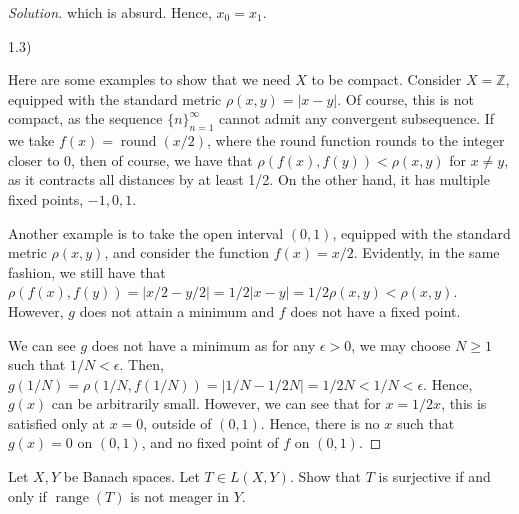\documentclass[10pt]{article}
\newenvironment{problem}[2][]{\begin{trivlist}
\item[\hskip \labelsep {\bfseries #1}\hskip \labelsep {\bfseries #2.}]}{\end{trivlist}}
\begin{document}
\begin{proof}[Solution]
which is absurd. Hence, $x_0 = x_1$. 

1.3)

Here are some examples to show that we need $X$ to be compact. Consider $X = \mathbb{Z}$, equipped with the standard metric $\rho(x,y) = | x - y | $. Of course, this is not compact, as the sequence $\{ n \}_{n=1}^\infty$ cannot admit any convergent subsequence. If we take $f(x) = \operatorname{round}(x/2)$, where the round function rounds to the integer closer to $0$, then of course, we have that $\rho(f(x), f(y)) < \rho(x,y)$ for $x \not = y$, as it contracts all distances by at least 1/2. On the other hand, it has multiple fixed points, $-1, 0, 1$.

Another example is to take the open interval $(0,1)$, equipped with the standard metric $\rho(x,y)$, and consider the function $f(x) = x/2$. Evidently, in the same fashion, we still have that $\rho(f(x), f(y)) = | x/2 - y/2 | = 1/2 | x- y | = 1/2 \rho(x,y) < \rho(x,y)$. However, $g$ does not attain a minimum and $f$ does not have a fixed point.

We can see $g$ does not have a minimum as for any $\epsilon > 0$, we may choose $N \geq 1$ such that $1/N < \epsilon$. Then, $g(1/N) = \rho(1/N, f(1/N)) = | 1/N - 1/2N | = 1/2N < 1/N < \epsilon$. Hence, $g(x)$ can be arbitrarily small. However, we can see that for $x = 1/2x$, this is satisfied only at $x = 0$, outside of $(0,1)$. Hence, there is no $x$ such that $g(x) = 0$ on $(0,1)$, and no fixed point of $f$ on $(0,1)$.

\end{proof}

\begin{problem}{Question 2}

Let $X, Y$ be Banach spaces. Let $T \in L(X,Y)$. Show that $T$ is surjective if and only if $\operatorname{range}(T)$ is not meager in $Y$.

\end{problem}
\end{document}
